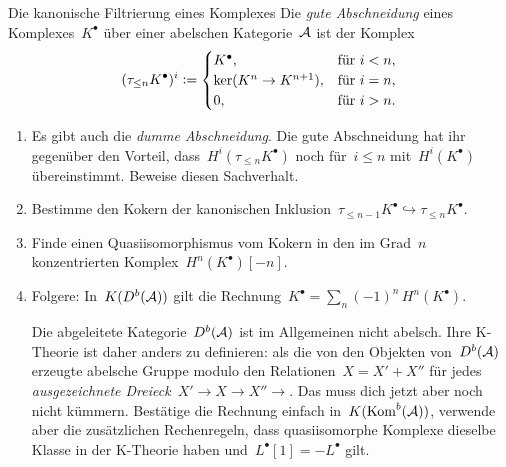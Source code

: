 \documentclass{uebblatt}
\begin{document}
\begin{aufgabe}{Die kanonische Filtrierung eines Komplexes}
Die \emph{gute Abschneidung} eines Komplexes~$K^\bullet$ über einer abelschen
Kategorie~$\mathcal{A}$ ist der Komplex
\[ (\tau_{\leq n} K^\bullet)^i \vcentcolon= \begin{cases}
  K^\bullet, & \text{für $i < n$}, \\
  \ker(K^n \to K^{n+1}), & \text{für $i = n$}, \\
  0, & \text{für $i > n$}.
\end{cases} \]

\begin{enumerate}
\item Es gibt auch die \emph{dumme Abschneidung}. Die gute Abschneidung hat ihr
gegenüber den Vorteil, dass~$H^i(\tau_{\leq n} K^\bullet)$ noch für~$i \leq n$
mit~$H^i(K^\bullet)$ übereinstimmt. Beweise diesen Sachverhalt.
\item Bestimme den Kokern der kanonischen Inklusion~$\tau_{\leq n-1}K^\bullet
\hookrightarrow \tau_{\leq n}K^\bullet$.
\item Finde einen Quasiisomorphismus vom Kokern in den im Grad~$n$
konzentrierten Komplex~$H^n(K^\bullet)[-n]$.
\item Folgere: In~$K(D^b(\mathcal{A}))$ gilt die
Rechnung~$K^\bullet = \sum_n (-1)^n\, H^n(K^\bullet)$.

{\scriptsize
Die abgeleitete Kategorie~$D^b(\mathcal{A})$ ist im Allgemeinen nicht abelsch.
Ihre K-Theorie ist daher anders zu definieren: als die von den Objekten
von~$D^b(\mathcal{A})$ erzeugte abelsche Gruppe modulo den Relationen~$X = X' +
X''$ für jedes \emph{ausgezeichnete Dreieck}~$X' \to X \to X'' \to$. Das muss dich
jetzt aber noch nicht kümmern. Bestätige die Rechnung einfach
in~$K(\mathrm{Kom}^b(\mathcal{A}))$, verwende aber die zusätzlichen Rechenregeln, dass
quasiisomorphe Komplexe dieselbe Klasse in der K-Theorie haben
und~$L^\bullet[1] = -L^\bullet$ gilt.
\par}
\end{enumerate}
\end{aufgabe}
\end{document}
